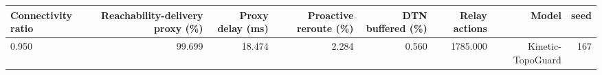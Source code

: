 \begin{tabular}{lrrrrrrr}
\toprule
Connectivity ratio & Reachability-delivery proxy (\%) & Proxy delay (ms) & Proactive reroute (\%) & DTN buffered (\%) & Relay actions & Model & seed \\
\midrule
0.950 & 99.699 & 18.474 & 2.284 & 0.560 & 1785.000 & Kinetic-TopoGuard & 167 \\
\bottomrule
\end{tabular}